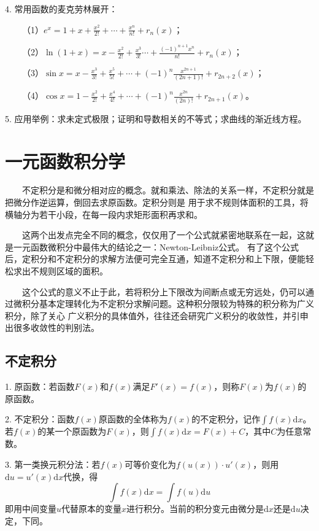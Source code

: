 4. 常用函数的麦克劳林展开：

~~~~（1）$e^x=1+x+\frac{x^2}{2!}+\cdots+\frac{x^n}{n!}+r_n(x)$；

~~~~（2）$\ln (1+x)=x-\frac{x^2}{2!}+\frac{x^3}{3!}\cdots+\frac{(-1)^{n+1}x^n}{n!}+r_n(x)$；

~~~~（3）$\sin x =x-\frac{x^3}{3!}+\frac{x^5}{5!}+\cdots+(-1)^n\frac{x^{2n+1}}{(2n+1)!}+r_{2n+2}(x)$；

~~~~（4）$\cos x =1-\frac{x^2}{2!}+\frac{x^4}{4!}+\cdots+(-1)^n\frac{x^{2n}}{(2n)!}+r_{2n+1}(x)$。

5. 应用举例：求未定式极限；证明和导数相关的不等式；求曲线的渐近线方程。

\section{一元函数积分学}

\begin{tcolorbox}[colback=red!5,colframe=red!75!black]
    ~~~~不定积分是和微分相对应的概念。就和乘法、除法的关系一样，不定积分就是把微分作逆运算，倒回去求原函数。定积分则是
    用于求不规则体面积的工具，将横轴分为若干小段，在每一段内求矩形面积再求和。

    ~~~~这两个出发点完全不同的概念，仅仅用了一个公式就紧密地联系在一起，这就是一元函数微积分中最伟大的结论之一：Newton-Leibniz公式。
    有了这个公式后，定积分和不定积分的求解方法便可完全互通，知道不定积分和上下限，便能轻松求出不规则区域的面积。

    ~~~~这个公式的意义不止于此，若将积分上下限改为间断点或无穷远处，仍可以通过微积分基本定理转化为不定积分求解问题。这种积分限较为特殊的积分称为广义积分，除了关心
    广义积分的具体值外，往往还会研究广义积分的收敛性，并引申出很多收敛性的判别法。
\end{tcolorbox}

\subsection{不定积分}

1. 原函数：若函数$F(x)$和$f(x)$满足$F'(x)=f(x)$，则称$F(x)$为$f(x)$的原函数。

2. 不定积分：函数$f(x)$原函数的全体称为$f(x)$的不定积分，记作$\int f(x)\mathrm{d}x$。
若$f(x)$的某一个原函数为$F(x)$，则$\int f(x)\mathrm{d}x = F(x)+C$，其中$C$为任意常数。

3. 第一类换元积分法：若$f(x)$可等价变化为$f\left(u(x)\right)\cdot u'(x)$，则用$\mathrm{d}u=u'(x)\mathrm{d}x$代换，得
\begin{equation*}
    \int f(x)\mathrm{d} x =\int f(u)\mathrm{d}u
\end{equation*}
即用中间变量$u$代替原本的变量$x$进行积分。当前的积分变元由微分是$\mathrm{d}x$还是$\mathrm{d}u$决定，下同。

